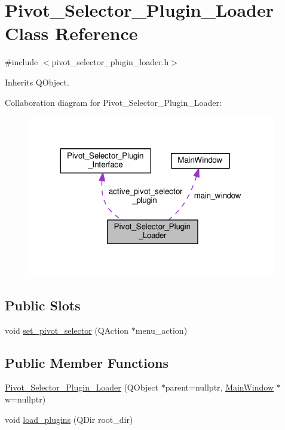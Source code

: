 \hypertarget{classPivot__Selector__Plugin__Loader}{}\section{Pivot\+\_\+\+Selector\+\_\+\+Plugin\+\_\+\+Loader Class Reference}
\label{classPivot__Selector__Plugin__Loader}


{\ttfamily \#include $<$pivot\+\_\+selector\+\_\+plugin\+\_\+loader.\+h$>$}



Inherits Q\+Object.



Collaboration diagram for Pivot\+\_\+\+Selector\+\_\+\+Plugin\+\_\+\+Loader\+:\nopagebreak
\begin{figure}[H]
\begin{center}
\leavevmode
\includegraphics[width=308pt]{classPivot__Selector__Plugin__Loader__coll__graph}
\end{center}
\end{figure}
\subsection*{Public Slots}
\begin{DoxyCompactItemize}
\item 
void \hyperlink{classPivot__Selector__Plugin__Loader_afe4c592a460c1219be70cbde7e36155b}{set\+\_\+pivot\+\_\+selector} (Q\+Action $\ast$menu\+\_\+action)
\end{DoxyCompactItemize}
\subsection*{Public Member Functions}
\begin{DoxyCompactItemize}
\item 
\hyperlink{classPivot__Selector__Plugin__Loader_a3c3767b485a10ef690e224e2d521e375}{Pivot\+\_\+\+Selector\+\_\+\+Plugin\+\_\+\+Loader} (Q\+Object $\ast$parent=nullptr, \hyperlink{classMainWindow}{Main\+Window} $\ast$w=nullptr)
\item 
void \hyperlink{classPivot__Selector__Plugin__Loader_ad29a07fed537d3aa5f6a64c10dc3c3c5}{load\+\_\+plugins} (Q\+Dir root\+\_\+dir)
\end{DoxyCompactItemize}
